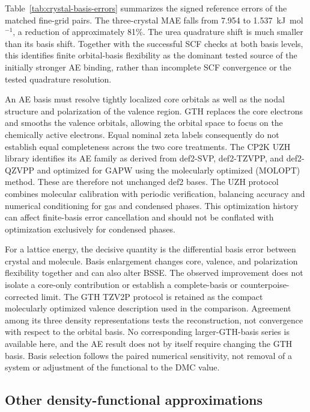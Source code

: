 Table~\ref{tab:crystal-basis-errors} summarizes the signed reference errors of the matched fine-grid pairs. The three-crystal MAE falls from 7.954 to 1.537~kJ~mol$^{-1}$, a reduction of approximately 81\%. The urea quadrature shift is much smaller than its basis shift. Together with the successful SCF checks at both basis levels, this identifies finite orbital-basis flexibility as the dominant tested source of the initially stronger AE binding, rather than incomplete SCF convergence or the tested quadrature resolution.

An AE basis must resolve tightly localized core orbitals as well as the nodal structure and polarization of the valence region. GTH replaces the core electrons and smooths the valence orbitals, allowing the orbital space to focus on the chemically active electrons. Equal nominal zeta labels consequently do not establish equal completeness across the two core treatments. The CP2K UZH library identifies its AE family as derived from def2-SVP, def2-TZVPP, and def2-QZVPP and optimized for GAPW using the molecularly optimized (MOLOPT) method.\cite{Weigend2005,VandeVondele2007,Mirhosseini2026UZH} These are therefore not unchanged def2 bases. The UZH protocol combines molecular calibration with periodic verification, balancing accuracy and numerical conditioning for gas and condensed phases. This optimization history can affect finite-basis error cancellation and should not be conflated with optimization exclusively for condensed phases.

For a lattice energy, the decisive quantity is the differential basis error between crystal and molecule. Basis enlargement changes core, valence, and polarization flexibility together and can also alter BSSE. The observed improvement does not isolate a core-only contribution or establish a complete-basis or counterpoise-corrected limit. The GTH TZV2P protocol is retained as the compact molecularly optimized valence description used in the comparison. Agreement among its three density representations tests the reconstruction, not convergence with respect to the orbital basis. No corresponding larger-GTH-basis series is available here, and the AE result does not by itself require changing the GTH basis. Basis selection follows the paired numerical sensitivity, not removal of a system or adjustment of the functional to the DMC value.

\subsection{Other density-functional approximations}
\label{sec:crystal-literature}

